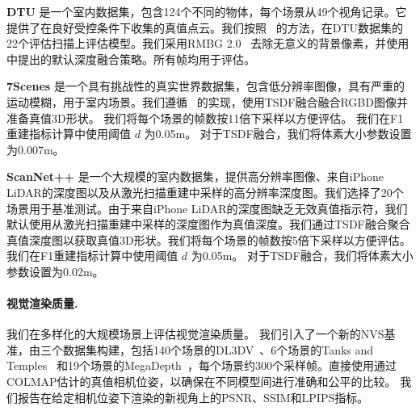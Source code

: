\textbf{DTU} 是一个室内数据集，包含124个不同的物体，每个场景从49个视角记录。它提供了在良好受控条件下收集的真值点云。我们按照~\cite{yao2018mvsnet} 的方法，在DTU数据集的22个评估扫描上评估模型。我们采用RMBG 2.0~\cite{BiRefNet} 去除无意义的背景像素，并使用 \cite{zhang2023geomvsnet} 中提出的默认深度融合策略。所有帧均用于评估。

\textbf{7Scenes} 是一个具有挑战性的真实世界数据集，包含低分辨率图像，具有严重的运动模糊，用于室内场景。我们遵循~\cite{zhu2024nicerslam} 的实现，使用TSDF融合融合RGBD图像并准备真值3D形状。
我们将每个场景的帧数按11倍下采样以方便评估。
我们在F1重建指标计算中使用阈值 $d$ 为0.05m。
对于TSDF融合，我们将体素大小参数设置为0.007m。

\textbf{ScanNet++} 是一个大规模的室内数据集，提供高分辨率图像、来自iPhone LiDAR的深度图以及从激光扫描重建中采样的高分辨率深度图。我们选择了20个场景用于基准测试。由于来自iPhone LiDAR的深度图缺乏无效真值指示符，我们默认使用从激光扫描重建中采样的深度图作为真值深度。我们通过TSDF融合聚合真值深度图以获取真值3D形状。我们将每个场景的帧数按5倍下采样以方便评估。我们在F1重建指标计算中使用阈值 $d$ 为0.05m。
对于TSDF融合，我们将体素大小参数设置为0.02m。

\paragraph{视觉渲染质量.} \label{sec:bm_ffnvs}
我们在多样化的大规模场景上评估视觉渲染质量。
我们引入了一个新的NVS基准，由三个数据集构建，包括140个场景的DL3DV~\citep{ling2024dl3dv}、6个场景的Tanks and Temples~\citep{knapitsch2017tanks} 和19个场景的MegaDepth~\citep{li2018megadepth}，每个场景约300个采样帧。直接使用通过COLMAP估计的真值相机位姿，以确保在不同模型间进行准确和公平的比较。
我们报告在给定相机位姿下渲染的新视角上的PSNR、SSIM和LPIPS指标。
